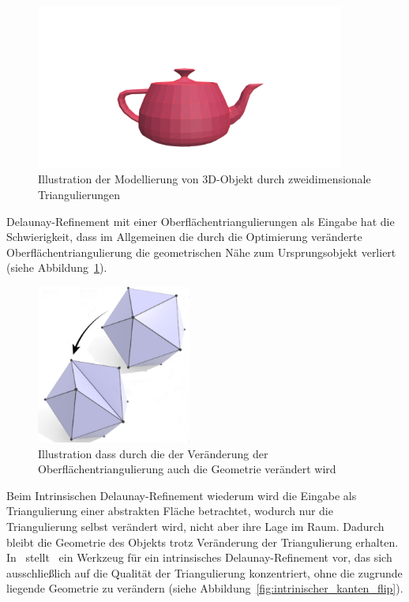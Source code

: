 \begin{figure}[H]%
    \centering
    \includegraphics[width=4in]{images/image7.png}
  \caption{Illustration  der Modellierung von 3D-Objekt durch zweidimensionale Triangulierungen }
\end{figure}

Delaunay-Refinement  mit einer Oberflächentriangulierungen als Eingabe hat die Schwierigkeit, dass im Allgemeinen die durch die Optimierung veränderte  Oberflächentriangulierung die geometrischen Nähe zum Ursprungsobjekt verliert (siehe Abbildung~\ref{fig:extrinsich_kanten_flip}).\\
\begin{figure}[H]%
    \centering
    \includegraphics[width=2in]{images/extrinsicher_kantenflip.jpg}
  \caption{Illustration  dass durch die der Veränderung der Oberflächentriangulierung auch die Geometrie verändert wird~\cite{Sharp:2019:NIT}}
  \label{fig:extrinsich_kanten_flip}
\end{figure}

Beim Intrinsischen Delaunay-Refinement  wiederum wird die Eingabe als Triangulierung einer abstrakten Fläche betrachtet, wodurch nur die Triangulierung selbst verändert wird, nicht aber ihre Lage im Raum. Dadurch bleibt die Geometrie des Objekts trotz Veränderung der Triangulierung erhalten.
In~\cite{Sharp:2019:NIT} stellt~\citeauthor{Sharp:2019:NIT} ein Werkzeug für ein intrinsisches Delaunay-Refinement  vor, das sich ausschließlich auf die Qualität der Triangulierung konzentriert, ohne die zugrunde liegende Geometrie zu verändern (siehe Abbildung~\ref{fig:intrinischer_kanten_flip}).\\  


